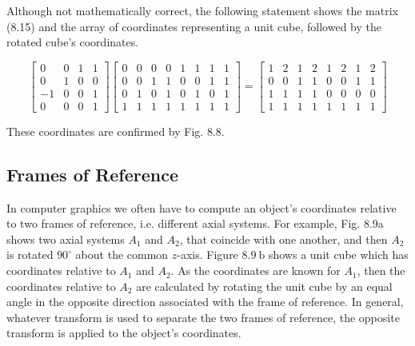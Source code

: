 \documentclass[10pt]{article}
\begin{document}
Although not mathematically correct, the following statement shows the matrix (8.15) and the array of coordinates representing a unit cube, followed by the rotated cube's coordinates.

$$
\left[\begin{array}{cccc}
0 & 0 & 1 & 1 \\
0 & 1 & 0 & 0 \\
-1 & 0 & 0 & 1 \\
0 & 0 & 0 & 1
\end{array}\right]\left[\begin{array}{llllllll}
0 & 0 & 0 & 0 & 1 & 1 & 1 & 1 \\
0 & 0 & 1 & 1 & 0 & 0 & 1 & 1 \\
0 & 1 & 0 & 1 & 0 & 1 & 0 & 1 \\
1 & 1 & 1 & 1 & 1 & 1 & 1 & 1
\end{array}\right]=\left[\begin{array}{llllllll}
1 & 2 & 1 & 2 & 1 & 2 & 1 & 2 \\
0 & 0 & 1 & 1 & 0 & 0 & 1 & 1 \\
1 & 1 & 1 & 1 & 0 & 0 & 0 & 0 \\
1 & 1 & 1 & 1 & 1 & 1 & 1 & 1
\end{array}\right]
$$

These coordinates are confirmed by Fig. 8.8.

\subsection{Frames of Reference}
In computer graphics we often have to compute an object's coordinates relative to two frames of reference, i.e. different axial systems. For example, Fig. 8.9a shows two axial systems $A_{1}$ and $A_{2}$, that coincide with one another, and then $A_{2}$ is rotated $90^{\circ}$ about the common $z$-axis. Figure $8.9 \mathrm{~b}$ shows a unit cube which has coordinates relative to $A_{1}$ and $A_{2}$. As the coordinates are known for $A_{1}$, then the coordinates relative to $A_{2}$ are calculated by rotating the unit cube by an equal angle in the opposite direction associated with the frame of reference. In general, whatever transform is used to separate the two frames of reference, the opposite transform is applied to the object's coordinates.
\end{document}
